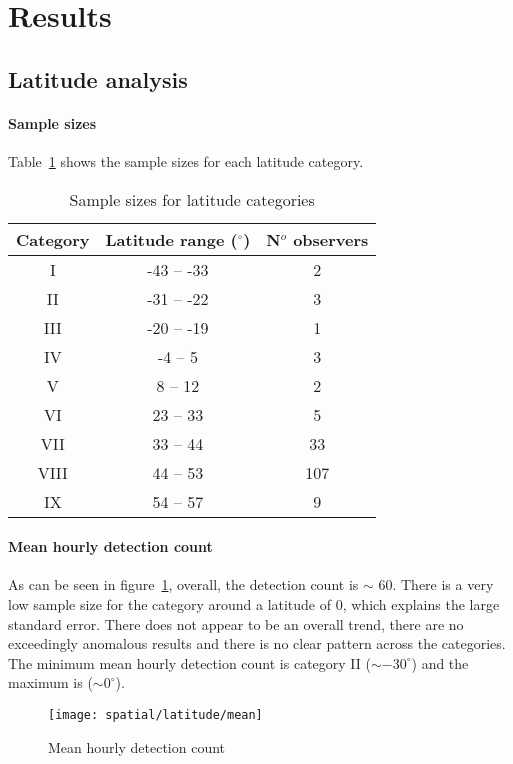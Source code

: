 \section{Results}

\subsection{Latitude analysis}
\paragraph{Sample sizes \\}
Table~\ref{tab:spat:lat} shows the sample sizes for each latitude category.
\begin{table}[h!]
	\centering
	\begin{tabular}{ccc}
		\hline 
		Category & Latitude range ($^{\circ}$) & N$^o$ observers \\ 
		\hline 
		I & -43 -- -33 & 2 \\
		II & -31 -- -22 & 3 \\
		III & -20 -- -19 & 1 \\
		IV & -4 -- 5 & 3 \\
		V & 8 -- 12 & 2 \\
		VI & 23 -- 33 & 5 \\
		VII & 33 -- 44 & 33 \\
		VIII & 44 -- 53 & 107\\
		IX & 54 -- 57 & 9 \\  
		\hline
	\end{tabular} 
	\caption{Sample sizes for latitude categories \label{tab:spat:lat}}
\end{table}

\paragraph{Mean hourly detection count\\}
As can be seen in figure~\ref{fig:spat:lat:mean}, overall, the detection count is $\sim$ 60. There is a very low sample size for the category around a latitude of 0, which explains the large standard error. There does not appear to be an overall trend, there are no exceedingly anomalous results and there is no clear pattern across the categories. The minimum mean hourly detection count is category II ($\sim -30^{\circ}$) and the maximum is ($\sim 0^{\circ}$).
\begin{figure}[h!]
	\centering
	\texttt{[image: spatial/latitude/mean]}
	\caption{Mean hourly detection count
		\label{fig:spat:lat:mean}}
\end{figure}

